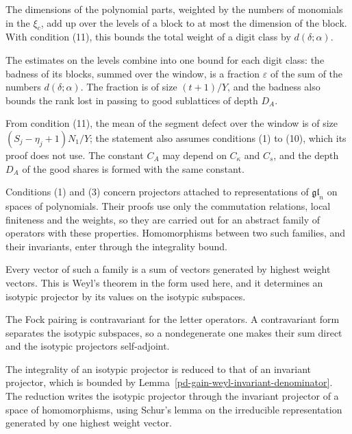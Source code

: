 The dimensions of the polynomial parts, weighted by the numbers of monomials in the $\xi_c$, add up over
the levels of a block to at most the dimension of the block. With condition (11), this bounds the total
weight of a digit class by $d(\delta;\alpha)$.

The estimates on the levels combine into one bound for each digit class: the badness of its blocks,
summed over the window, is a fraction $\varepsilon$ of the sum of the numbers $d(\delta;\alpha)$. The
fraction is of size $(t+1)/Y$, and the badness also bounds the rank lost in passing to good sublattices of
depth $D_A$.

From condition (11), the mean of the segment defect over the window is of size
$(S_j-\eta_j+1)N_1/Y$; the statement also assumes conditions (1) to (10), which its proof does not use. The constant $C_A$ may depend on $C_\kappa$ and $C_s$, and the depth $D_A$ of the
good shares is formed with the same constant.

Conditions (1) and (3) concern projectors attached to representations of $\mathfrak{gl}_n$ on spaces of
polynomials. Their proofs use only the commutation relations, local finiteness and the weights, so they
are carried out for an abstract family of operators with these properties. Homomorphisms between two
such families, and their invariants, enter through the integrality bound.

Every vector of such a family is a sum of vectors generated by highest weight vectors. This is Weyl's
theorem in the form used here, and it determines an isotypic projector by its values on the isotypic
subspaces.

The Fock pairing is contravariant for the letter operators. A contravariant form separates the isotypic
subspaces, so a nondegenerate one makes their sum direct and the isotypic projectors self-adjoint.

The integrality of an isotypic projector is reduced to that of an invariant projector, which is bounded by
Lemma~\ref{pd-gain-weyl-invariant-denominator}. The reduction writes the isotypic projector through the
invariant projector of a space of homomorphisms, using Schur's lemma on the irreducible representation
generated by one highest weight vector.

